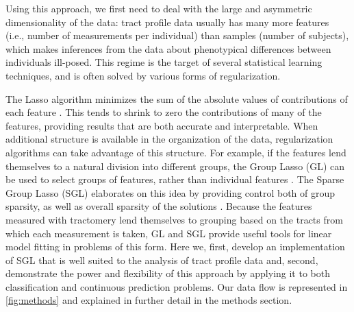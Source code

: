 \documentclass[10pt,letterpaper]{article}
\begin{document}

Using this approach, we first need to deal with the large and
asymmetric dimensionality of the data: tract profile
data usually has
many more features (i.e., number of measurements per individual) than
samples (number of subjects), which makes inferences from the data
about phenotypical differences between individuals ill-posed. This
regime is the target of several statistical learning techniques, and
is often solved by various forms of regularization.

The Lasso algorithm minimizes the sum of the absolute values of
contributions of each feature \cite{Tibshirani1996-qs}. This
tends to shrink to zero the contributions of many of the features,
providing results that are both accurate and interpretable. When
additional structure is available in the organization of the data,
regularization algorithms can take advantage of this structure. For
example, if the features lend themselves to a natural division into
different groups, the Group Lasso (GL) can be used to select groups
of features, rather than individual features \cite{Yuan2006-ky}.
The Sparse Group Lasso (SGL) elaborates on this idea by providing
control both of group sparsity, as well as overall sparsity of the
solutions \cite{simon2013sgl}. Because the features measured with
tractomery lend themselves to grouping based on the tracts from which
each measurement is taken, GL and SGL provide useful tools
for linear model fitting in problems of this form. Here we, first,
develop an implementation of SGL that is well suited to the analysis of
tract profile data and, second, demonstrate the power and flexibility of
this approach by applying it to both classification
and continuous prediction problems. Our data flow is
represented in \cref{fig:methods} and explained in further detail in
the methods section.
\end{document}
